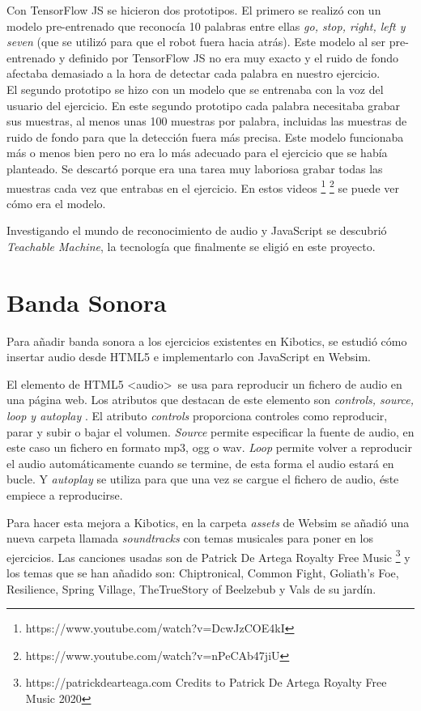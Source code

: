 Con TensorFlow JS se hicieron dos prototipos. El primero se realizó con un modelo pre-entrenado que reconocía 10 palabras entre ellas \textit{go, stop, right, left y seven} (que se utilizó para que el robot fuera hacia atrás).
Este modelo al ser pre-entrenado y definido por TensorFlow JS no era muy exacto y el ruido de fondo afectaba demasiado a la hora de detectar cada palabra en nuestro ejercicio. 
\\
El segundo prototipo se hizo con un modelo que se entrenaba con la voz del usuario del ejercicio. En este segundo prototipo cada palabra necesitaba grabar sus muestras, al menos unas 100 muestras por palabra, incluidas las muestras de ruido de fondo para que la detección fuera más precisa. Este modelo funcionaba más o menos bien pero no era lo más adecuado para el ejercicio que se había planteado. Se descartó porque era una tarea muy laboriosa grabar todas las muestras cada vez que entrabas en el ejercicio. 
En estos videos \footnote{https://www.youtube.com/watch?v=DcwJzCOE4kI}
\footnote{https://www.youtube.com/watch?v=nPeCAb47jiU} se puede ver cómo era el modelo.

Investigando el mundo de reconocimiento de audio y JavaScript se descubrió \textit{Teachable Machine}, la tecnología que finalmente se eligió en este proyecto.


\section{Banda Sonora}

Para añadir banda sonora a los ejercicios existentes en Kibotics, se estudió cómo insertar audio desde HTML5 e implementarlo con JavaScript en Websim.

El elemento de HTML5 \textless audio\textgreater \, se usa para reproducir un fichero de audio en una página web.
Los atributos que destacan de este elemento son \textit{controls, source, loop y autoplay }.
El atributo \textit{controls} proporciona controles como reproducir, parar y subir o bajar el volumen.
 \textit{Source} permite especificar la fuente de audio, en este caso un fichero en formato mp3, ogg o wav. \textit{Loop} permite volver a reproducir el audio automáticamente cuando se termine, de esta forma  el audio estará en bucle. Y \textit{autoplay} se utiliza para que una vez se cargue el fichero de audio, éste empiece a reproducirse.

Para hacer esta mejora a Kibotics, en la carpeta \textit{assets} de Websim se añadió una nueva carpeta llamada \textit{soundtracks} con temas musicales para poner en los ejercicios. Las canciones usadas son de Patrick De Artega Royalty Free Music  \footnote{ https://patrickdearteaga.com Credits to Patrick De Artega Royalty Free Music 2020}
y los temas que se han añadido son:
Chiptronical, Common Fight, Goliath's Foe, Resilience, Spring Village, TheTrueStory of Beelzebub y Vals de su jardín.


